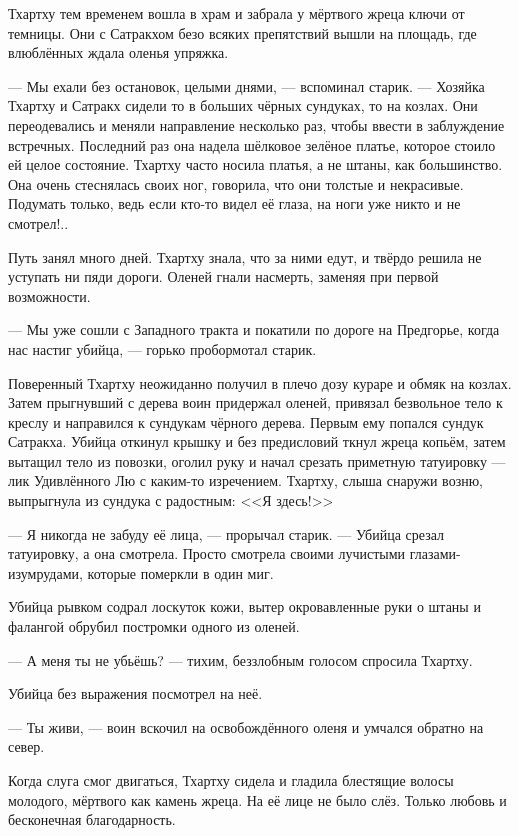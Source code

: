 Тхартху тем временем вошла в храм и забрала у мёртвого жреца ключи от темницы.
Они с Сатракхом безо всяких препятствий вышли на площадь, где влюблённых ждала оленья упряжка.

--- Мы ехали без остановок, целыми днями, --- вспоминал старик.
--- Хозяйка Тхартху и Сатракх сидели то в больших чёрных сундуках, то на козлах.
Они переодевались и меняли направление несколько раз, чтобы ввести в заблуждение встречных.
Последний раз она надела шёлковое зелёное платье, которое стоило ей целое состояние.
Тхартху часто носила платья, а не штаны, как большинство.
Она очень стеснялась своих ног, говорила, что они толстые и некрасивые.
Подумать только, ведь если кто-то видел её глаза, на ноги уже никто и не смотрел!..

Путь занял много дней.
Тхартху знала, что за ними едут, и твёрдо решила не уступать ни пяди дороги.
Оленей гнали насмерть, заменяя при первой возможности.

--- Мы уже сошли с Западного тракта и покатили по дороге на Предгорье, когда нас настиг убийца, --- горько пробормотал старик.

Поверенный Тхартху неожиданно получил в плечо дозу кураре и обмяк на козлах.
Затем прыгнувший с дерева воин придержал оленей, привязал безвольное тело к креслу и направился к сундукам чёрного дерева.
Первым ему попался сундук Сатракха.
Убийца откинул крышку и без предисловий ткнул жреца копьём, затем вытащил тело из повозки, оголил руку и начал срезать приметную татуировку --- лик Удивлённого Лю с каким-то изречением.
Тхартху, слыша снаружи возню, выпрыгнула из сундука с радостным: <<Я здесь!>>

--- Я никогда не забуду её лица, --- прорычал старик.
--- Убийца срезал татуировку, а она смотрела.
Просто смотрела своими лучистыми глазами-изумрудами, которые померкли в один миг.

Убийца рывком содрал лоскуток кожи, вытер окровавленные руки о штаны и фалангой обрубил постромки одного из оленей.

--- А меня ты не убьёшь? --- тихим, беззлобным голосом спросила Тхартху.

Убийца без выражения посмотрел на неё.

--- Ты живи, --- воин вскочил на освобождённого оленя и умчался обратно на север.

Когда слуга смог двигаться, Тхартху сидела и гладила блестящие волосы молодого, мёртвого как камень жреца.
На её лице не было слёз.
Только любовь и бесконечная благодарность.

